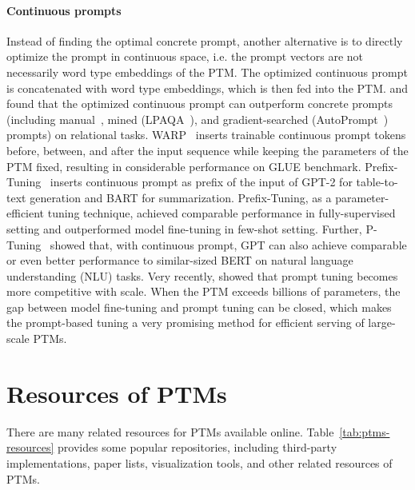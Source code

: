 \documentclass[fleqn]{SCYE-arxiv}
\begin{document}
\begin{multicols}{2}
\paragraph{Continuous prompts} Instead of finding the optimal concrete prompt, another alternative is to directly optimize the prompt in continuous space, i.e. the prompt vectors are not necessarily word type embeddings of the PTM. The optimized continuous prompt is concatenated with word type embeddings, which is then fed into the PTM. \citet{Qin2021Learning} and \citet{Zhong2021Factual} found that the optimized continuous prompt can outperform concrete prompts (including manual~\cite{petroni2019language}, mined (LPAQA~\cite{Jiang2020How}), and gradient-searched (AutoPrompt~\cite{Shin2020AutoPrompt}) prompts) on relational tasks. WARP~\cite{Hambardzumyan2021WARP} inserts trainable continuous prompt tokens before, between, and after the input sequence while keeping the parameters of the PTM fixed, resulting in considerable performance on GLUE benchmark. Prefix-Tuning~\cite{Li2021Prefix} inserts continuous prompt as prefix of the input of GPT-2 for table-to-text generation and BART for summarization. Prefix-Tuning, as a parameter-efficient tuning technique, achieved comparable performance in fully-supervised setting and outperformed model fine-tuning in few-shot setting. Further, P-Tuning~\cite{Liu2021PTuning} showed that, with continuous prompt, GPT can also achieve comparable or even better performance to similar-sized BERT on natural language understanding (NLU) tasks. Very recently, \citet{Lester2021Power} showed that prompt tuning becomes more competitive with scale. When the PTM exceeds billions of parameters, the gap between model fine-tuning and prompt tuning can be closed, which makes the prompt-based tuning a very promising method for efficient serving of large-scale PTMs.



\section{Resources of PTMs}
\label{sec:resources}

There are many related resources for PTMs available online. Table~\ref{tab:ptms-resources} provides some popular repositories, including third-party implementations, paper lists, visualization tools, and other related resources of PTMs.



\end{multicols}
\end{document}
